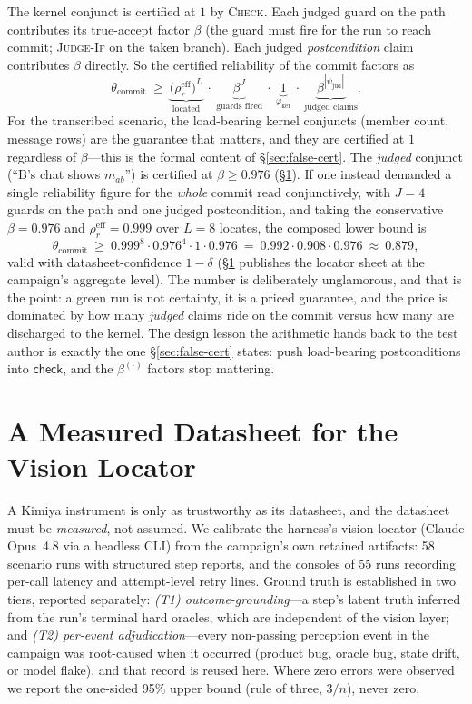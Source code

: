 \documentclass[acmsmall,screen,nonacm]{acmart}
\newcommand{\checkk}{\mathsf{check}}
\newcommand{\conf}{\theta}
\theoremstyle{acmdefinition}%
\theoremstyle{acmplain}%
\begin{document}
The kernel conjunct is certified at $1$ by \textsc{Check}. Each judged
guard on the path contributes its true-accept factor $\beta$ (the guard
must fire for the run to reach commit; \textsc{Judge-If} on the taken
branch). Each judged \emph{postcondition} claim contributes $\beta$
directly. So the certified reliability of the commit factors as
\[
\conf_{\mathrm{commit}}\ \ge\
\underbrace{\big(\rho_r^{\mathrm{eff}}\big)^{L}}_{\text{located}}\
\cdot\ \underbrace{\beta^{J}}_{\text{guards fired}}\
\cdot\ \underbrace{1}_{\varphi_{\mathrm{ker}}}\
\cdot\ \underbrace{\beta^{|\psi_{\mathrm{jud}}|}}_{\text{judged claims}} .
\]
For the transcribed scenario, the load-bearing kernel conjuncts (member
count, message rows) are the guarantee that matters, and they are
certified at $1$ regardless of $\beta$---this is the formal content of
\S\ref{sec:false-cert}. The \emph{judged} conjunct (``B's chat shows
$m_{ab}$'') is certified at $\beta\ge 0.976$ (\S\ref{sec:datasheet}). If
one instead demanded a single reliability figure for the \emph{whole}
commit read conjunctively, with $J=4$ guards on the path and one judged
postcondition, and taking the conservative $\beta=0.976$ and
$\rho_r^{\mathrm{eff}}=0.999$ over $L=8$ locates, the composed lower bound
is
\[
\conf_{\mathrm{commit}}\ \ge\ 0.999^{8}\cdot 0.976^{4}\cdot 1\cdot 0.976
\ =\ 0.992\cdot 0.908\cdot 0.976\ \approx\ 0.879,
\]
valid with datasheet-confidence $1-\delta$ (\S\ref{sec:datasheet}
publishes the locator sheet at the campaign's aggregate level). The
number is deliberately unglamorous, and that is the point: a green run is
not certainty, it is a priced guarantee, and the price is dominated by
how many \emph{judged} claims ride on the commit versus how many are
discharged to the kernel. The design lesson the arithmetic hands back to
the test author is exactly the one \S\ref{sec:false-cert} states: push
load-bearing postconditions into $\checkk$, and the $\beta^{(\cdot)}$
factors stop mattering.

\section{A Measured Datasheet for the Vision Locator}
\label{sec:datasheet}

A Kimiya instrument is only as trustworthy as its datasheet, and the
datasheet must be \emph{measured}, not assumed. We calibrate the harness's
vision locator (Claude Opus~4.8 via a headless CLI) from the campaign's
own retained artifacts: 58 scenario runs with structured step reports, and
the consoles of 55 runs recording per-call latency and attempt-level retry
lines. Ground truth is established in two tiers, reported separately:
\emph{(T1) outcome-grounding}---a step's latent truth inferred from the
run's terminal hard oracles, which are independent of the vision layer;
and \emph{(T2) per-event adjudication}---every non-passing perception
event in the campaign was root-caused when it occurred (product bug,
oracle bug, state drift, or model flake), and that record is reused here.
Where zero errors were observed we report the one-sided 95\% upper bound
(rule of three, $3/n$), never zero.
\end{document}
